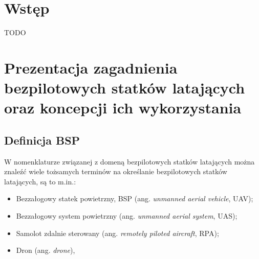 

\newcommand{\kierunek}{INFORMATYKA}
\newcommand{\stopien}{STUDIA II$^{\mathrm{o}}$} %
\newcommand{\temat}{MOBILNY SYSTEM ZARZĄDZANIA I STEROWANIA BEZPILOTOWYM STATKIEM LATAJĄCYM}
\newcommand{\data}{Warszawa 2022}
\newcommand{\autor}{Norbert WASZKOWIAK}
\newcommand{\promotor}{dr inż. Michał DYK}
\newcommand{\zgoda}{TAK} %
\newcommand{\specjalnosc}{SYSTEMY INFORMATYCZNE}

\newcommand{\bibTitle}[1]{``#1''}




\inserttitlepage

\section*{Wstęp} 

TODO
    


\clearpage

\newpage
\section{Prezentacja zagadnienia bezpilotowych statków latających oraz koncepcji ich wykorzystania}
\subsection{Definicja BSP}
W nomenklaturze związanej z domeną bezpilotowych statków latających można znaleźć wiele tożsamych terminów na określanie bezpilotowych statków latających, są to m.in.:
\begin{itemize}
  \setlength\itemsep{1mm} %
  \item Bezzałogowy statek powietrzny, BSP (ang. \textit{unmanned aerial vehicle}, UAV);
  \item Bezzałogowy system powietrzny (ang. \textit{unmanned aerial system}, UAS);
  \item Samolot zdalnie sterowany (ang. \textit{remotely piloted aircraft}, RPA);
  \item Dron (ang. \textit{drone}),
\end{itemize}

